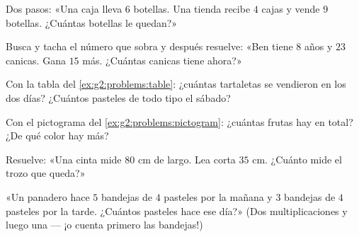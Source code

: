 \begin{exercise}[$\star$]\label{exo:g2:problems:5}
Dos pasos: «Una caja lleva $6$ botellas. Una tienda recibe $4$ cajas y
vende $9$ botellas. ¿Cuántas botellas le quedan?»
\end{exercise}

\begin{exercise}[$\star$]\label{exo:g2:problems:6}
Busca y tacha el número que sobra y después resuelve: «Ben tiene $8$
años y $23$ canicas. Gana $15$ más. ¿Cuántas canicas tiene
ahora?»
\end{exercise}

\begin{exercise}[$\star$]\label{exo:g2:problems:7}
Con la tabla del \cref{ex:g2:problems:table}: ¿cuántas tartaletas se vendieron
en los dos días? ¿Cuántos pasteles de todo tipo el sábado?
\end{exercise}

\begin{exercise}[$\star$]\label{exo:g2:problems:8}
Con el pictograma del \cref{ex:g2:problems:pictogram}: ¿cuántas
frutas hay en total? ¿De qué color hay más?
\end{exercise}

\begin{exercise}[$\star$]\label{exo:g2:problems:9}
Resuelve: «Una cinta mide $80$ cm de largo. Lea corta $35$ cm. ¿Cuánto mide
el trozo que queda?»
\end{exercise}

\begin{exercise}[$\star\star$]\label{exo:g2:problems:10}
«Un panadero hace $5$ bandejas de $4$ pasteles por la mañana y $3$ bandejas
de $4$ pasteles por la tarde. ¿Cuántos pasteles hace ese día?» (Dos
multiplicaciones y luego una  --- ¡o cuenta primero las bandejas!)
\end{exercise}
